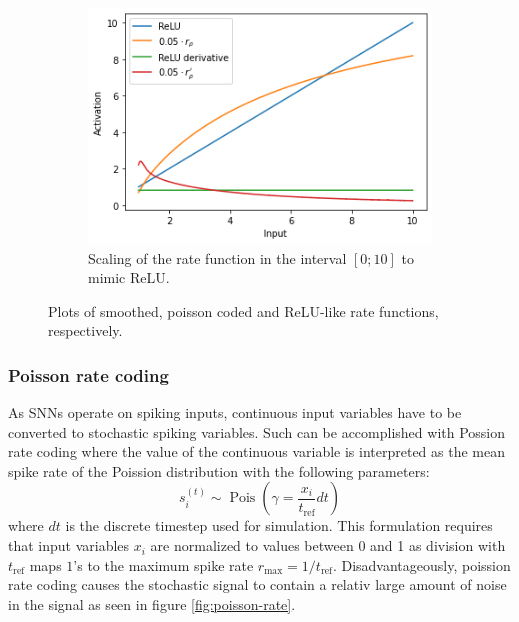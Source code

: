\documentclass[a4paper,11pt]{article} %
\DeclareMathOperator{\Pois}{Pois}
\begin{document}
\begin{figure}
\begin{subfigure}[t]{0.32\textwidth}
    \includegraphics[width=\textwidth]{graphics/rate-scaling.png}
    \caption{Scaling of the rate function in the interval $[0; 10]$ to mimic ReLU.}
    \label{fig:rate-scaling}
  \end{subfigure}
  \caption{Plots of smoothed, poisson coded and ReLU-like rate functions, respectively.}
\end{figure}



\subsubsection{Poisson rate coding}
As SNNs operate on spiking inputs, continuous input variables have to be converted to stochastic spiking variables. Such can be accomplished with Possion rate coding where the value of the continuous variable is interpreted as the mean spike rate of the Poission distribution with the following parameters:
\begin{equation}
  s_i^{(t)} \sim \Pois \left( \gamma = \frac{x_i}{t_\text{ref}} dt \right)
\end{equation}
where $dt$ is the discrete timestep used for simulation. This formulation requires that input variables $x_i$ are normalized to values between 0 and 1 as division with $t_\text{ref}$ maps $1$'s to the maximum spike rate $r_\text{max} = 1 / t_\text{ref}$. Disadvantageously, poission rate coding causes the stochastic signal to contain a relativ large amount of noise in the signal as seen in figure \ref{fig:poisson-rate}.
\end{document}

